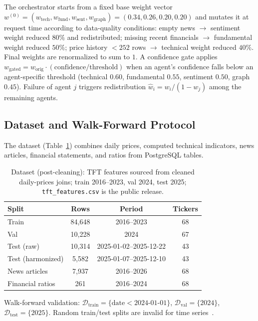 \documentclass[conference]{IEEEtran}
\begin{document}
The orchestrator starts from a fixed base weight vector $w^{(0)} = (w_\text{tech}, w_\text{fund}, w_\text{sent}, w_\text{graph}) = (0.34, 0.26, 0.20, 0.20)$ and mutates it at request time according to data-quality conditions: empty news $\to$ sentiment weight reduced $80\%$ and redistributed; missing recent financials $\to$ fundamental weight reduced $50\%$; price history $<252$ rows $\to$ technical weight reduced $40\%$. Final weights are renormalized to sum to $1$. A confidence gate applies $w_\text{gated} = w_\text{orig} \cdot (\text{confidence}/\text{threshold})$ when an agent's confidence falls below an agent-specific threshold (technical $0.60$, fundamental $0.55$, sentiment $0.50$, graph $0.45$). Failure of agent $j$ triggers redistribution $\hat{w}_i = w_i / (1 - w_j)$ among the remaining agents.

\subsection{Dataset and Walk-Forward Protocol}

The dataset (Table~\ref{tab:dataset_compact}) combines daily prices, computed technical indicators, news articles, financial statements, and ratios from PostgreSQL tables.

\begin{table}[htbp]
\centering
\caption{Dataset (post-cleaning): TFT features sourced from cleaned daily-prices joins; train 2016--2023, val 2024, test 2025; \texttt{tft\_features.csv} is the public release.}
\label{tab:dataset_compact}
\footnotesize
\setlength{\tabcolsep}{4pt}
\begin{tabular}{lccc}
\toprule
\textbf{Split} & \textbf{Rows} & \textbf{Period} & \textbf{Tickers} \\
\midrule
Train               & 84{,}648  & 2016--2023 & 68 \\
Val                 & 10{,}228  & 2024       & 67 \\
Test (raw)          & 10{,}314  & 2025-01-02--2025-12-22 & 43 \\
Test (harmonized)   & 5{,}582   & 2025-01-07--2025-12-10 & 43 \\
\midrule
News articles       & 7{,}937   & 2016--2026 & 68 \\
Financial ratios    & 261       & 2016--2024 & 68 \\
\bottomrule
\end{tabular}
\end{table}

Walk-forward validation: $\mathcal{D}_\text{train} = \{\text{date} < 2024\text{-}01\text{-}01\}$, $\mathcal{D}_\text{val} = \{2024\}$, $\mathcal{D}_\text{test} = \{2025\}$. Random train/test splits are invalid for time series~\cite{ref:bergmeir_cv_ts}.
\end{document}
